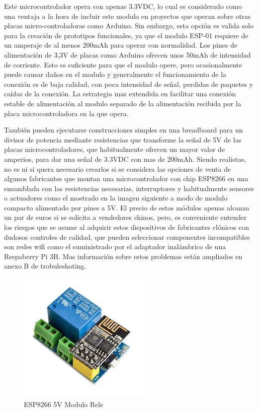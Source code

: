 \vspace{1.5cm}

Este microcontrolador opera con apenas 3.3VDC, lo cual es considerado como una ventaja a la hora de incluir este modulo en proyectos que operan sobre otras placas micro-controladoras como Arduino. Sin embargo, esta opción es valida solo para la creación de prototipos funcionales, ya que el modulo ESP-01 requiere de un amperaje de al menos 200mAh para operar con normalidad. Los pines de alimentación de 3,3V de placas como Arduino ofrecen unos 50mAh de intensidad de corriente. Esto es suficiente para que el modulo opere, pero ocasionalmente puede causar daños en el modulo y generalmente el funcionamiento de la conexión es de baja calidad, con poca intensidad de señal, perdidas de paquetes y caídas de la conexión. La estrategia mas extendida en facilitar una conexión estable de alimentación al modulo separado de la alimentación recibida por la placa microcontroladora en la que opera.

\vspace{1.5cm}

También pueden ejecutarse construcciones simples en una breadboard para un divisor de potencia mediante resistencias que transforme la señal de 5V de las placas microcontroladores, que habitualmente ofrecen un mayor valor de amperios, para dar una señal de 3.3VDC con mas de 200mAh. Siendo realistas, no es ni si quera necesario crearlos si se considera las opciones de venta de algunos fabricantes que montan una microcontrolador con chip ESP8266 en una ensamblada con las resistencias necesarias, interruptores y habitualmente sensores o actuadores como el mostrado en la imagen siguiente a modo de modulo compacto alimentado por pines a 5V. El precio de estos módulos apenas alcanza un par de euros si se solicita a vendedores chinos, pero, es conveniente entender los riesgos que se asume al adquirir estos dispositivos de fabricantes clónicos con dudosos controles de calidad, que pueden seleccionar componentes incompatibles son redes \gls{wifi} como el suministrado por el adaptador inalámbrico de una Respaberry Pi 3B. Mas información sobre estos problemas están ampliados en anexo B de trobuleshoting.

\begin{figure}[hbt!]
\centering
\includegraphics[height=2.5in]{figures/esp8266exRele.jpg}
\caption[ESP-01S con rele]{ESP8266 5V Modulo Rele\footnotemark}
\end{figure}

